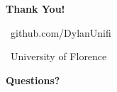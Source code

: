 \documentclass[10pt, aspectratio=169]{beamer}
\begin{document}
\begin{frame}[plain]
    \centering
    \vspace*{0.9cm}
    {\LARGE\textbf{Thank You!}\par}
    \vfill
    {\normalsize\faGithub\ github.com/DylanUnifi\par}
    \vspace{0.30cm}
    {\normalsize\faUniversity\ University of Florence\par}
    \vspace{0.65cm}
    {\large\textbf{Questions?}\par}
    \vspace*{0.9cm}
\end{frame}
\end{document}

